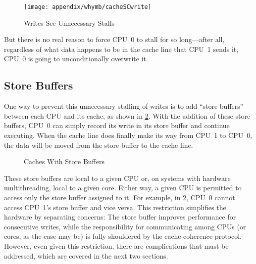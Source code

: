 \begin{figure}
\centering
\texttt{[image: appendix/whymb/cacheSCwrite]}
\caption{Writes See Unnecessary Stalls}
\label{fig:app:whymb:Writes See Unnecessary Stalls}
\end{figure}

But there is no real reason to force CPU~0 to stall for so long---after
all, regardless of what data happens to be in the cache line that CPU~1
sends it, CPU~0 is going to unconditionally overwrite it.

\subsection{Store Buffers}
\label{sec:app:whymb:Store Buffers}

One way to prevent this unnecessary stalling of writes is to add
``store buffers'' between each CPU and its cache, as shown in
\cref{fig:app:whymb:Caches With Store Buffers}.
With the addition of these store buffers, CPU~0 can simply record
its write in its store buffer and continue executing.
When the cache line does finally make its way from CPU~1 to CPU~0,
the data will be moved from the store buffer to the cache line.

\QuickQuizEnd

\begin{figure}
\centering
{}
\caption{Caches With Store Buffers}
\label{fig:app:whymb:Caches With Store Buffers}
\end{figure}

These store buffers are local to a given CPU or, on systems with
hardware multithreading, local to a given core.
Either way, a given CPU is permitted to access only the store buffer
assigned to it.
For example, in
\cref{fig:app:whymb:Caches With Store Buffers}, CPU~0 cannot
access CPU~1's store buffer and vice versa.
This restriction simplifies the hardware by separating concerns:
The store buffer improves performance for consecutive writes, while
the responsibility for communicating among CPUs (or cores, as the
case may be) is fully shouldered by the cache-coherence protocol.
However, even given this restriction, there are complications that must
be addressed, which are covered in the next two sections.

